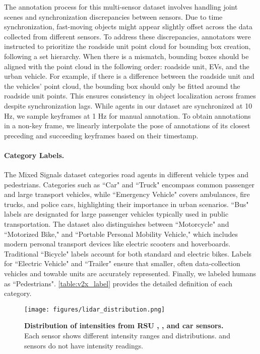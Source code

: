 The annotation process for this multi-sensor dataset involves handling joint scenes and synchronization discrepancies between sensors. Due to time synchronization, fast-moving objects might appear slightly offset across the data collected from different sensors. To address these discrepancies, annotators were instructed to prioritize the roadside unit point cloud for bounding box creation, following a set hierarchy. When there is a mismatch, bounding boxes should be aligned with the point cloud in the following order: roadside unit,  EVs, and the urban vehicle. For example, if there is a difference between the roadside unit and the vehicles' point cloud, the bounding box should only be fitted around the roadside unit points. This ensures consistency in object localization across frames despite synchronization lags.
%
While agents in our dataset are synchronized at 10 Hz, we sample keyframes at 1 Hz for manual annotation.
To obtain annotations in a non-key frame, we linearly interpolate the pose of annotations of its closest preceding and succeeding keyframes based on their timestamp.

\paragraph{Category Labels.}
The Mixed Signals dataset categories road agents in different vehicle types and pedestrians. Categories such as ``Car" and ``Truck" encompass common passenger and large transport vehicles, while ``Emergency Vehicle" covers ambulances, fire trucks, and police cars, highlighting their importance in urban scenarios. ``Bus" labels are designated for large passenger vehicles typically used in public transportation. The dataset also distinguishes between ``Motorcycle" and ``Motorized Bike," and ``Portable Personal Mobility Vehicle," which includes modern personal transport devices like electric scooters and hoverboards. Traditional ``Bicycle" labels account for both standard and electric bikes. Labels for ``Electric Vehicle" and ``Trailer" ensure that smaller, often data-collection vehicles and towable units are accurately represented. Finally, we labeled humans as ``Pedestrians".
\autoref{table:v2x_label} provides the detailed definition of each category.





\begin{figure}[t]
\centering
\texttt{[image: figures/lidar\_distribution.png]}
\caption{\small \textbf{Distribution of \lidar intensities from RSU \rsutop, \rsudome, and \laser car sensors.} Each sensor shows different intensity ranges and distributions. \evone and \evtwo \lidar sensors do not have intensity readings.}
\label{fig:lidar-intensities}

\vspace{-16px}
\end{figure}



